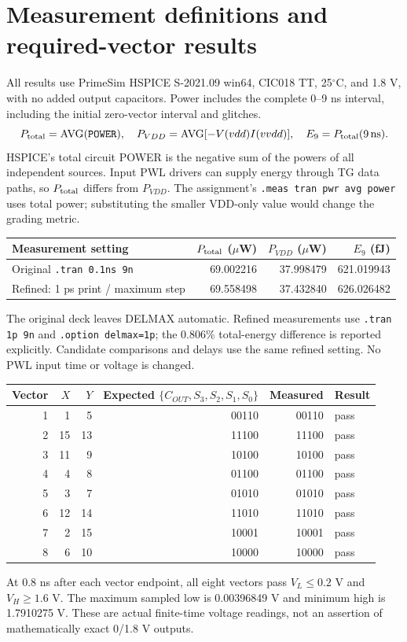 \documentclass[11pt,a4paper]{article}
\begin{document}
\newpage
\section{Measurement definitions and required-vector results}
All results use PrimeSim HSPICE S-2021.09 win64, CIC018 TT, 25$^\circ$C,
and 1.8 V, with no added output capacitors. Power includes the complete
0--9 ns interval, including the initial zero-vector interval and glitches.
\[
P_{\rm total}=\operatorname{AVG}(\texttt{POWER}),\quad
P_{VDD}=\operatorname{AVG}[-V(vdd)I(vvdd)],\quad E_9=P_{\rm total}(9\,\mathrm{ns}).
\]
HSPICE's total circuit POWER is the negative sum of the powers of all
independent sources. Input PWL drivers can supply energy through TG data
paths, so $P_{\rm total}$ differs from $P_{VDD}$. The assignment's
\texttt{.meas tran pwr avg power} uses total power; substituting the smaller
VDD-only value would change the grading metric.

\begin{center}\small
\begin{tabular}{lrrr}\toprule
Measurement setting & $P_{\rm total}$ ($\mu$W) & $P_{VDD}$ ($\mu$W) & $E_9$ (fJ)\\\midrule
Original \texttt{.tran 0.1ns 9n} & 69.002216 & 37.998479 & 621.019943\\
Refined: 1 ps print / maximum step & 69.558498 & 37.432840 & 626.026482\\\bottomrule
\end{tabular}\end{center}
The original deck leaves DELMAX automatic. Refined measurements use
\texttt{.tran 1p 9n} and \texttt{.option delmax=1p}; the 0.806\% total-energy
difference is reported explicitly. Candidate comparisons and delays use
the same refined setting. No PWL input time or voltage is changed.

\begin{center}\small
\begin{tabular}{rrrrrl}\toprule
Vector & $X$ & $Y$ & Expected $\{C_{OUT},S_3,S_2,S_1,S_0\}$ & Measured & Result\\\midrule
1 & 1 & 5 & 00110 & 00110 & pass \\
2 & 15 & 13 & 11100 & 11100 & pass \\
3 & 11 & 9 & 10100 & 10100 & pass \\
4 & 4 & 8 & 01100 & 01100 & pass \\
5 & 3 & 7 & 01010 & 01010 & pass \\
6 & 12 & 14 & 11010 & 11010 & pass \\
7 & 2 & 15 & 10001 & 10001 & pass \\
8 & 6 & 10 & 10000 & 10000 & pass \\
\bottomrule\end{tabular}\end{center}
At 0.8 ns after each vector endpoint, all eight vectors pass
$V_L\leq0.2$ V and $V_H\geq1.6$ V. The maximum sampled low is
0.00396849 V and minimum high is 1.7910275 V. These are actual finite-time
voltage readings, not an assertion of mathematically exact 0/1.8 V outputs.
\end{document}
